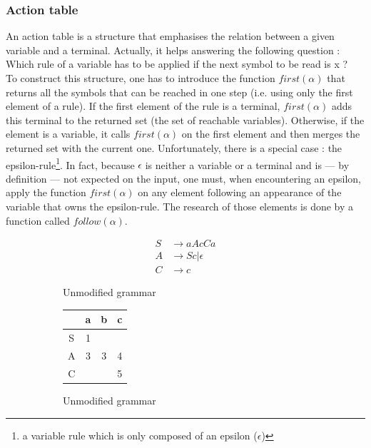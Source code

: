 \documentclass[a4paper,11pt]{article}
\begin{document}
    \subsubsection{Action table}
      An action table is a structure that emphasises the relation between a given variable and a terminal. Actually, it helps answering the following question : Which rule of a variable has to be applied if the next symbol to be read is x ?\\
      To construct this structure, one has to introduce the function $first(\alpha)$ that returns all the symbols that can be reached in one step (i.e. using only the first element of a rule). If the first element of the rule is a terminal, $first(\alpha)$ adds this terminal to the returned set (the set of reachable variables). Otherwise, if the element is a variable, it calls $first(\alpha)$ on the first element and then merges the returned set with the current one. Unfortunately, there is a special case : the epsilon-rule\footnote{a variable rule which is only composed of an epsilon ($\epsilon$)}. In fact, because $\epsilon$ is neither a variable or a terminal and is --- by definition --- not expected on the input, one must, when encountering an epsilon, apply the function $first(\alpha)$ on any element following an appearance of the variable that owns the epsilon-rule. The research of those elements is done by a function called $follow(\alpha)$.
      \begin{figure}[h!]
        \centering
        \begin{subfigure}[b]{0.4\textwidth}
            \centering
            \begin{align}
              S &\rightarrow aAcCa \\
              A &\rightarrow Sc | \epsilon \\
              C &\rightarrow c
            \end{align}
            \caption{Unmodified grammar}
            \label{fig:unmodifiedgrammar1}
        \end{subfigure}
        \begin{subfigure}[b]{0.4\textwidth}
            \centering
            \begin{tabular}{|c||c|c|c|}
              \hline
                & a & b & c \\
              \hline
              \hline
              S & 1 &   &   \\
              \hline
              A & 3 & 3 & 4 \\
              \hline
              C &   &   & 5 \\
              \hline
            \end{tabular}
            \caption{Unmodified grammar}
            \label{fig:unmodifiedgrammar1}
        \end{subfigure}
        \caption{}
        \label{}
      \end{figure}
      
\end{document}
